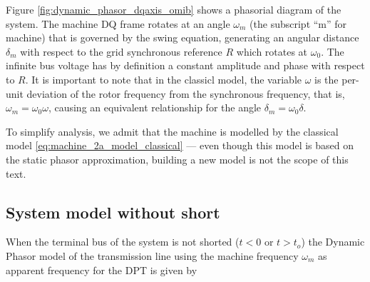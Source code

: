 	Figure \ref{fig:dynamic_phasor_dqaxis_omib} shows a phasorial diagram of the system. The machine DQ frame rotates at an angle $\omega_m$ (the subscript ``m'' for machine) that is governed by the swing equation, generating an angular distance $\delta_m$ with respect to the grid synchronous reference $R$ which rotates at $\omega_0$. The infinite bus voltage has by definition a constant amplitude and phase with respect to $R$. It is important to note that in the classicl model, the variable $\omega$ is the per-unit deviation of the rotor frequency from the synchronous frequency, that is, $\omega_m = \omega_0\omega$, causing an equivalent relationship for the angle $\delta_m = \omega_0\delta$.

	To simplify analysis, we admit that the machine is modelled by the classical model \eqref{eq:machine_2a_model_classical} — even though this model is based on the static phasor approximation, building a new model is not the scope of this text.

\subsection{System model without short} %

	When the terminal bus of the system is not shorted ($t < 0$ or $t > t_o$) the Dynamic Phasor model of the transmission line using the machine frequency $\omega_m$ as apparent frequency for the DPT is given by

